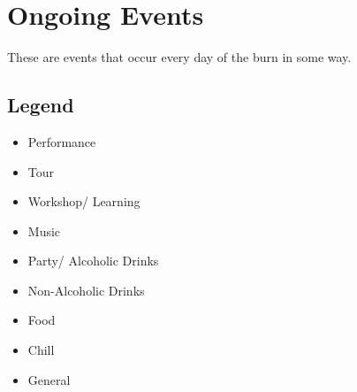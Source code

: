 \chapter{Ongoing Events}

These are events that occur every day of the burn in some way.

\section*{Legend}
\begin{multicols}{2}
\begin{itemize}
   \item[\faTheaterMasks] Performance
   \item[\faIcon{bus-alt}] Tour
   \item[\faGraduationCap] Workshop/ Learning
   \item[\faMusic] Music
   \item[\faIcon{glass-martini-alt}] Party/ Alcoholic Drinks
   \item[\faCoffee] Non-Alcoholic Drinks
   \item[\faPizzaSlice] Food
   \item[\faUmbrellaBeach] Chill 
   \item[{\faIcon[regular]{calendar-alt}}] General
\end{itemize}
\end{multicols}

